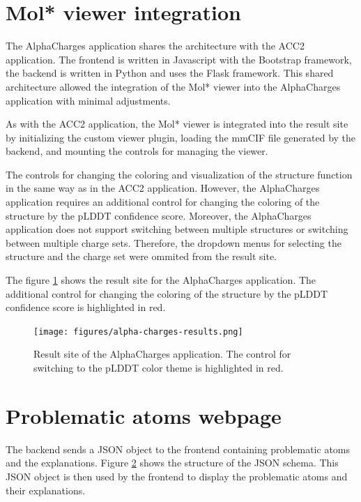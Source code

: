 \documentclass[
  digital,     %
  oneside,     %
  nosansbold,  %
  nocolorbold, %
  lof,         %
  lot,         %
]{fithesis4}
\begin{document}
\section{Mol* viewer integration}

The AlphaCharges application shares the architecture with the ACC2 application. The frontend is written in Javascript with the Bootstrap framework, the backend is written in Python and uses the Flask framework. This shared architecture allowed the integration of the Mol* viewer into the AlphaCharges application with minimal adjustments.

As with the ACC2 application, the Mol* viewer is integrated into the result site by initializing the custom viewer plugin, loading the mmCIF file generated by the backend, and mounting the controls for managing the viewer.

The controls for changing the coloring and visualization of the structure function in the same way as in the ACC2 application. However, the AlphaCharges application requires an additional control for changing the coloring of the structure by the pLDDT confidence score. Moreover, the AlphaCharges application does not support switching between multiple structures or switching between multiple charge sets. Therefore, the dropdown menus for selecting the structure and the charge set were ommited from the result site.

The figure \ref{fig:alpha-charges-results} shows the result site for the AlphaCharges application. The additional control for changing the coloring of the structure by the pLDDT confidence score is highlighted in red.

\begin{figure}[htbp]
  \begin{center}
    \texttt{[image: figures/alpha-charges-results.png]}
  \end{center}
  \caption{Result site of the AlphaCharges application. The control for switching to the pLDDT color theme is highlighted in red.}
  \label{fig:alpha-charges-results}
\end{figure}

\section{Problematic atoms webpage}

The backend sends a JSON object to the frontend containing problematic atoms and the explanations. Figure \ref{} shows the structure of the JSON schema. This JSON object is then used by the frontend to display the problematic atoms and their explanations.
\end{document}
